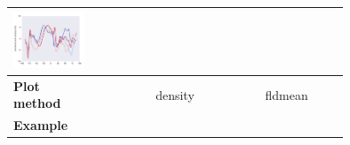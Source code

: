 \begin{refsection}
\begin{subappendices}
\begin{tabular}[c]{l|p{0.25\linewidth}|p{0.25\linewidth}|p{0.25\linewidth}|}
				\includegraphics[width=\linewidth, page=9]{psyplot-figures/psy-simple-demo.pdf} \\
			\midrule
			\midrule
			\textbf{Plot method} & \multicolumn{2}{c|}{density} & {\centering fldmean}  \\
			\hline
			\textbf{Example} & 

\end{tabular}
\end{subappendices}
\end{refsection}

